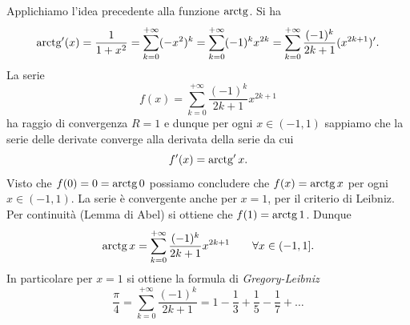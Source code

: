 \begin{example}
Applichiamo l'idea precedente alla funzione $\operatorname{arctg}$. Si ha
\[
  \operatorname{arctg}'(x) = \frac{1}{1+x^2} = \sum_{k=0}^{+\infty} (-x^2)^k
  = \sum_{k=0}^{+\infty} (-1)^k x^{2k}
  = \sum_{k=0}^{+\infty} \frac{(-1)^k}{2k+1}(x^{2k+1})'.
\]
La serie
\[
 f(x) = \sum_{k=0}^{+\infty}\frac{(-1)^k}{2k+1} x^{2k+1}
\]
ha raggio di convergenza $R=1$ e dunque per ogni $x\in(-1,1)$ sappiamo che la serie delle derivate converge alla derivata della serie da cui
\[
  f'(x) = \operatorname{arctg}' x.
\]
Visto che $f(0) = 0 = \operatorname{arctg} 0$ possiamo concludere che $f(x) =\operatorname{arctg} x$ per ogni $x\in (-1,1)$.
La serie è convergente anche per $x=1$, per il criterio di Leibniz. Per continuità (Lemma di Abel) si ottiene che $f(1) = \operatorname{arctg} 1$.
Dunque
\[
  \operatorname{arctg} x = \sum_{k=0}^{+\infty}\frac{(-1)^k}{2k+1}x^{2k+1}
  \qquad \forall x \in (-1,1].
\]
In particolare per $x=1$ si ottiene la formula di \emph{Gregory-Leibniz}%
\[
  \frac{\pi}{4} = \sum_{k=0}^{+\infty} \frac{(-1)^k}{2k+1} =
   1 - \frac{1}{3} + \frac{1}{5} - \frac{1}{7} + \dots
\]
\end{example}

